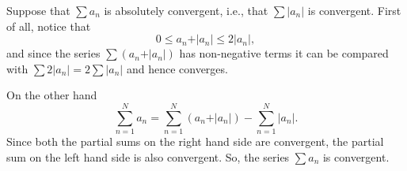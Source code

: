 \documentclass[12pt]{article}
\begin{document}
Suppose that $\sum a_n$ is absolutely convergent, i.e., that $\sum \vert a_n \vert$ is convergent.
First of all, notice that 
\[
  0\le a_n + \vert a_n \vert \le 2 \vert a_n\vert,
\]
and since the series $\sum (a_n+\vert a_n\vert)$ has non-negative terms it can be compared with $\sum 2\vert a_n\vert=2\sum \vert a_n\vert$ and hence converges.

On the other hand
\[
 \sum_{n=1}^N a_n = \sum_{n=1}^N (a_n+\vert a_n\vert) - \sum_{n=1}^N \vert a_n\vert.
\]
Since both the partial sums on the right hand side are convergent, the partial 
sum on the left hand side is also convergent. So, the series $\sum a_n$ is convergent.
\end{document}

